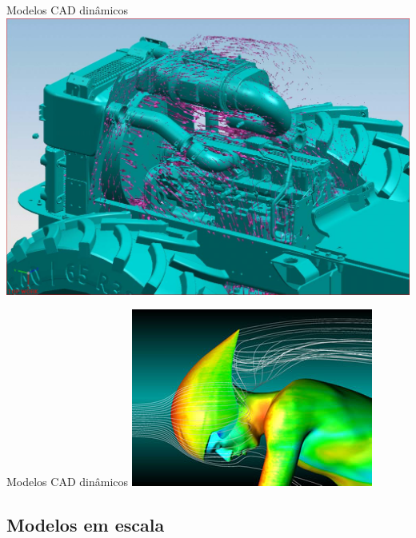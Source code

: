 \documentclass{beamer}
\begin{document}
\begin{frame}{Modelos CAD dinâmicos}
  \centering
  \includegraphics[width=\textwidth]{modelos/Ugs-nx-5-engine-airflow-simulation}
\end{frame}

\begin{frame}{Modelos CAD dinâmicos}
  \centering
  \includegraphics[width=\textwidth]{modelos/cycliste-cfd}
\end{frame}

\subsection{Modelos em escala}
\end{document}
